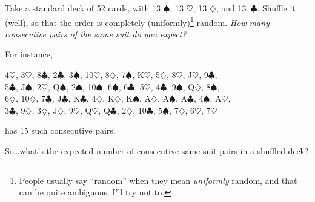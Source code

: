 
Take a standard deck of 52 cards, with 13 $\spadesuit$, 13 $\heartsuit$, 13 $\diamondsuit$, and 13~$\clubsuit$. Shuffle it (well), so that the order is completely (uniformly)\footnote{People usually say ``random'' when they mean \emph{uniformly} random, and that can be quite ambiguous. I'll try not to.} random. \emph{How many consecutive pairs of the same suit do you expect?}

For instance,
\begin{center}
4$\heartsuit$, 3$\heartsuit$, 8$\clubsuit$, 2$\clubsuit$, 3$\spadesuit$, 10$\heartsuit$, 8$\diamondsuit$, 7$\spadesuit$, K$\heartsuit$, 5$\diamondsuit$, 8$\heartsuit$, J$\heartsuit$, 9$\clubsuit$, \\
5$\clubsuit$, J$\spadesuit$, 2$\heartsuit$, Q$\spadesuit$, 2$\spadesuit$, 10$\spadesuit$, 6$\spadesuit$, 6$\clubsuit$, 5$\heartsuit$, 4$\clubsuit$,  9$\spadesuit$,  Q$\diamondsuit$,  8$\spadesuit$,  \\
6$\diamondsuit$, 10$\diamondsuit$, 7$\clubsuit$, J$\clubsuit$, K$\clubsuit$, 4$\diamondsuit$, K$\diamondsuit$, K$\spadesuit$, A$\diamondsuit$, A$\spadesuit$, A$\clubsuit$, 4$\spadesuit$, A$\heartsuit$,  \\
3$\clubsuit$, 9$\diamondsuit$, 3$\diamondsuit$, J$\diamondsuit$, 9$\heartsuit$, Q$\heartsuit$, Q$\clubsuit$, 2$\diamondsuit$, 10$\clubsuit$, 5$\spadesuit$, 7$\diamondsuit$, 6$\heartsuit$, 7$\heartsuit$
\end{center}
has 15 such consecutive pairs.

So\dots what's the expected number of consecutive same-suit pairs in a shuffled deck?

